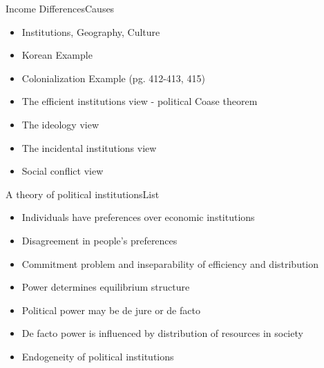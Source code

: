 \documentclass{beamer}
\begin{document}
\begin{frame}{Income Differences}{Causes}
\begin{itemize}
\item{Institutions, Geography, Culture}
\item{Korean Example}
\item{Colonialization Example (pg. 412-413, 415)}
\item{The efficient institutions view - political Coase theorem}
\item{The ideology view}
\item{The incidental institutions view}
\item{Social conflict view}
\end{itemize}
\end{frame}

\begin{frame}{A theory of political institutions}{List}
\begin{itemize}
\item{Individuals have preferences over economic institutions}
\item{Disagreement in people's preferences}
\item{Commitment problem and inseparability of efficiency and distribution}
\item{Power determines equilibrium structure}
\item{Political power may be de jure or de facto}
\item{De facto power is influenced by distribution of resources in society}
\item{Endogeneity of political institutions}
\end{itemize}
\end{frame}
\end{document}
